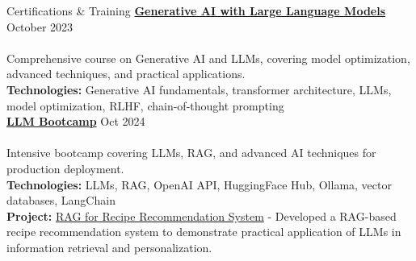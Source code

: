 \documentclass{resume}
\begin{document}
\begin{rSection}{Certifications \& Training}
            {\href{https://coursera.org/share/9459a80d6710c6beebe8355a73b52368}{\textbf{Generative AI with Large Language Models}}} \hfill {October 2023}
        \\ %
        {}
        \\ %
        Comprehensive course on Generative AI and LLMs, covering model optimization, advanced techniques, and practical applications. %
        \\
        \textbf{Technologies:} Generative AI fundamentals, transformer architecture, LLMs, model optimization, RLHF, chain-of-thought prompting
        \\
                
            \vspace{0.1em}
                    {\href{https://certificate.datatalks.club/llm-zoomcamp/2024/55db812d19a5b355790d127cb88ca72afdc49df5.pdf}{\textbf{LLM Bootcamp}}} \hfill {Oct 2024}
        \\ %
        {}
        \\ %
        Intensive bootcamp covering LLMs, RAG, and advanced AI techniques for production deployment. %
        \\
        \textbf{Technologies:} LLMs, RAG, OpenAI API, HuggingFace Hub, Ollama, vector databases, LangChain
        \\
                    \textbf{Project:} \href{https://github.com/ArturGR3/food_search_RAG}{RAG for Recipe Recommendation System} - 
            Developed a RAG-based recipe recommendation system to demonstrate practical application of LLMs in information retrieval and personalization.
                

\end{rSection}
\end{document}
